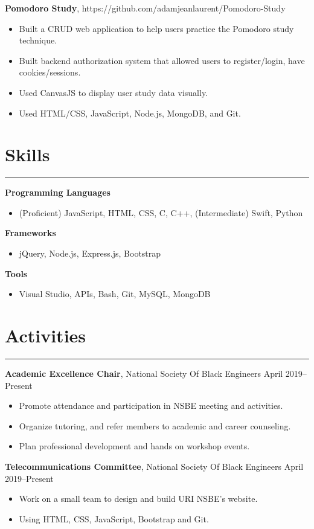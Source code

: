 \documentclass[11pt]{article}
\newcommand{\resumesection}[1]{\vspace{-0.2cm}\section*{#1}\vspace{-0.2cm}\hrule\vspace{0.2cm}}
\begin{document}
\textbf{Pomodoro Study}, https://github.com/adamjeanlaurent/Pomodoro-Study
\begin{itemize}
	\item Built a CRUD web application to help users practice the Pomodoro study technique.
	\item  Built backend authorization system that allowed users to register/login, have cookies/sessions.
	\item Used CanvasJS to display user study data visually.
	\item Used HTML/CSS, JavaScript, Node.js, MongoDB, and Git.
\end{itemize}

\resumesection{Skills}

\textbf{Programming Languages}
\begin{itemize}
	\item (Proficient) JavaScript, HTML, CSS, C, C++, (Intermediate) Swift, Python 
\end{itemize}

\textbf{Frameworks}
\begin{itemize}
	\item jQuery, Node.js, Express.js, Bootstrap
\end{itemize}

\textbf{Tools}
\begin{itemize}
	\item Visual Studio, APIs, Bash, Git, MySQL, MongoDB
\end{itemize}

\resumesection{Activities}

\textbf{Academic Excellence Chair}, National Society Of Black Engineers \hfill April 2019--Present
\begin{itemize}
	\item Promote attendance and participation in NSBE meeting and activities.
	\item Organize tutoring, and refer members to academic and career counseling.
	\item Plan professional development and hands on workshop events.
\end{itemize}

\textbf{Telecommunications Committee}, National Society Of Black Engineers \hfill April 2019--Present
\begin{itemize}
	\item Work on a small team to design and build URI NSBE's website.
	\item Using HTML, CSS, JavaScript, Bootstrap and Git.
\end{itemize}
\end{document}
